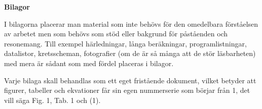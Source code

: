\begin{mdframed}[innertopmargin=10pt, innerbottommargin=10pt, innerleftmargin=10pt, innerrightmargin=10pt, skipabove=10pt, skipbelow=10pt, roundcorner=10pt]
    \textbf{Bilagor}
    
    I bilagorna placerar man material som inte behövs för den omedelbara förståelsen av arbetet men som behövs som stöd eller bakgrund för påståenden och resonemang. Till exempel härledningar, långa beräkningar, programlistningar, datalistor, kretsscheman, fotografier (om de är så många att de stör läsbarheten) med mera är sådant som med fördel placeras i bilagor. 
    
    Varje bilaga skall behandlas som ett eget fristående dokument, vilket betyder att figurer, tabeller och ekvationer får sin egen nummerserie som börjar från 1, det vill säga Fig. 1, Tab. 1 och (1).
    \end{mdframed}
    